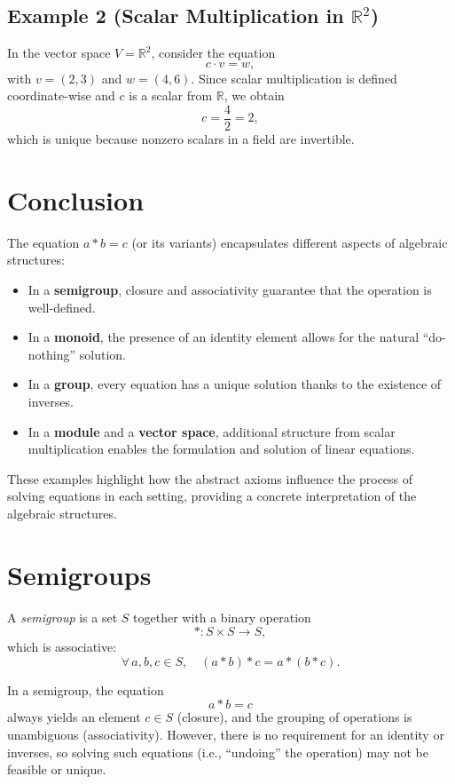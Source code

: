 \documentclass[11pt,openany]{article}
\begin{document}
\subsection*{Example 2 (Scalar Multiplication in \(\mathbb{R}^2\))}
In the vector space \(V=\mathbb{R}^2\), consider the equation
\[
c \cdot v = w,
\]
with \(v=(2,3)\) and \(w=(4,6)\). Since scalar multiplication is defined coordinate-wise and \(c\) is a scalar from \(\mathbb{R}\), we obtain
\[
c = \frac{4}{2} = 2,
\]
which is unique because nonzero scalars in a field are invertible.

\section{Conclusion}
The equation \(a\ast b = c\) (or its variants) encapsulates different aspects of algebraic structures:
\begin{itemize}
	\item In a \textbf{semigroup}, closure and associativity guarantee that the operation is well-defined.
	\item In a \textbf{monoid}, the presence of an identity element allows for the natural “do-nothing” solution.
	\item In a \textbf{group}, every equation has a unique solution thanks to the existence of inverses.
	\item In a \textbf{module} and a \textbf{vector space}, additional structure from scalar multiplication enables the formulation and solution of linear equations.
\end{itemize}
These examples highlight how the abstract axioms influence the process of solving equations in each setting, providing a concrete interpretation of the algebraic structures.

\newpage

\section{Semigroups}
\begin{definition}[Semigroup]
	A \emph{semigroup} is a set \(S\) together with a binary operation 
	\[
	\ast: S\times S \to S,
	\]
	which is associative:
	\[
	\forall\, a,b,c\in S,\quad (a\ast b)\ast c = a\ast (b\ast c).
	\]
\end{definition}

In a semigroup, the equation
\[
a\ast b = c
\]
always yields an element \(c\in S\) (closure), and the grouping of operations is unambiguous (associativity). However, there is no requirement for an identity or inverses, so solving such equations (i.e., “undoing” the operation) may not be feasible or unique.
\end{document}
